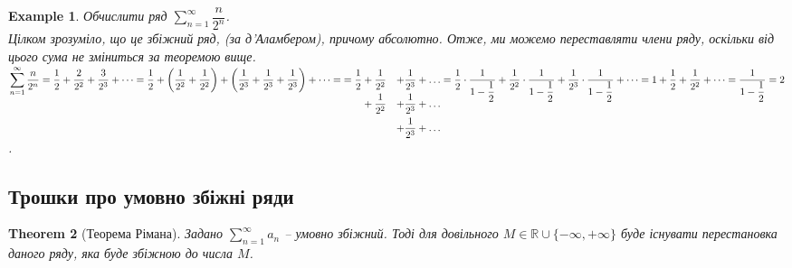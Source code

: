 \documentclass[a4paper, 10pt]{article}
\def\huge{\displaystyle}
\theoremstyle{theoremdd}
\newtheorem{theorem}{Theorem}[subsection]
\theoremstyle{theoremdd}
\theoremstyle{theoremdd}
\theoremstyle{theoremdd}
\theoremstyle{theoremdd}
\newtheorem{example}[theorem]{Example}
\theoremstyle{theoremdd}
\theoremstyle{theoremdd}
\theoremstyle{theoremdd}
\theoremstyle{theoremdd}
\begin{document}
\begin{example}
Обчислити ряд $\displaystyle\sum_{n=1}^\infty \dfrac{n}{2^n}$.\\
Цілком зрозуміло, що це збіжний ряд, (за д'Аламбером), причому абсолютно. Отже, ми можемо переставляти члени ряду, оскільки від цього сума не зміниться за теоремою вище.\\
$\displaystyle\sum_{n=1}^\infty \dfrac{n}{2^n} = \dfrac{1}{2} + \dfrac{2}{2^2} + \dfrac{3}{2^3} + \dots = \dfrac{1}{2} + \left( \dfrac{1}{2^2} + \dfrac{1}{2^2} \right) + \left( \dfrac{1}{2^3} + \dfrac{1}{2^3} + \dfrac{1}{2^3} \right) + \dots = \\
\begin{aligned}[t]
= \dfrac{1}{2} & + \dfrac{1}{2^2} & + \dfrac{1}{2^3} + \dots \\
& + \dfrac{1}{2^2} & + \dfrac{1}{2^3} + \dots \\
& & + \dfrac{1}{2^3} + \dots
\end{aligned} \\
 = \dfrac{1}{2} \cdot \dfrac{1}{1-\dfrac{1}{2}} + \dfrac{1}{2^2} \cdot \dfrac{1}{1-\dfrac{1}{2}} + \dfrac{1}{2^3} \cdot \dfrac{1}{1-\dfrac{1}{2}} + \dots = 1 + \dfrac{1}{2} + \dfrac{1}{2^2} + \dots = \dfrac{1}{1-\dfrac{1}{2}} = 2$.
\end{example}

\subsection{Трошки про умовно збіжні ряди}
\begin{theorem}[Теорема Рімана]
Задано $\huge \sum_{n=1}^\infty a_n$ -- умовно збіжний. Тоді для довільного $M \in \mathbb{R} \cup \{-\infty, +\infty\}$ буде існувати перестановка даного ряду, яка буде збіжною до числа $M$.
\end{theorem}
\end{document}
